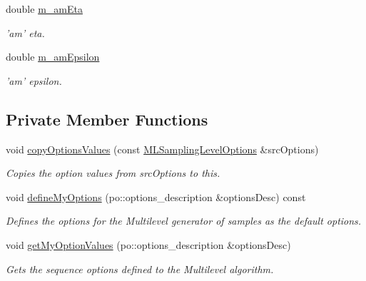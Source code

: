 \begin{DoxyCompactItemize}
\item 
double \hyperlink{class_q_u_e_s_o_1_1_m_l_sampling_level_options_a87fe9b1c390bf7bff2ecc329064e7618}{m\-\_\-am\-Eta}
\begin{DoxyCompactList}\small\item\em 'am' eta. \end{DoxyCompactList}\item 
double \hyperlink{class_q_u_e_s_o_1_1_m_l_sampling_level_options_abf07f60a5115657e18d39a586a8093ac}{m\-\_\-am\-Epsilon}
\begin{DoxyCompactList}\small\item\em 'am' epsilon. \end{DoxyCompactList}\end{DoxyCompactItemize}
\subsection*{Private Member Functions}
\begin{DoxyCompactItemize}
\item 
void \hyperlink{class_q_u_e_s_o_1_1_m_l_sampling_level_options_a0e2afd2df142beb5e4bb76c869d990c2}{copy\-Options\-Values} (const \hyperlink{class_q_u_e_s_o_1_1_m_l_sampling_level_options}{M\-L\-Sampling\-Level\-Options} \&src\-Options)
\begin{DoxyCompactList}\small\item\em Copies the option values from {\ttfamily src\-Options} to {\ttfamily this}. \end{DoxyCompactList}\item 
void \hyperlink{class_q_u_e_s_o_1_1_m_l_sampling_level_options_afb11ad6373f4faf8cb195496e1b0f0c7}{define\-My\-Options} (po\-::options\-\_\-description \&options\-Desc) const 
\begin{DoxyCompactList}\small\item\em Defines the options for the Multilevel generator of samples as the default options. \end{DoxyCompactList}\item 
void \hyperlink{class_q_u_e_s_o_1_1_m_l_sampling_level_options_abb31a2e1b926dae1b9a566a0fbc56f0f}{get\-My\-Option\-Values} (po\-::options\-\_\-description \&options\-Desc)
\begin{DoxyCompactList}\small\item\em Gets the sequence options defined to the Multilevel algorithm. \end{DoxyCompactList}\end{DoxyCompactItemize}
